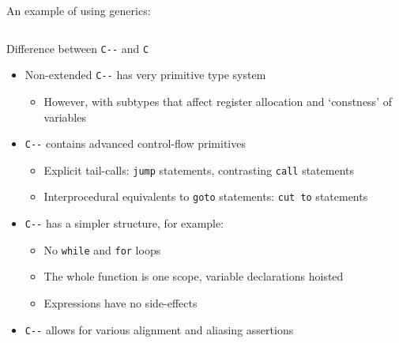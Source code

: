 \documentclass[aspectratio=169]{beamer}
\newcommand{\li}[1]{\lstinline{#1}}
\def\cmm{\texttt{C-\relax-}}
\begin{document}
\begin{frame}
  \centering
  An example of using generics:
  \begin{columns}
    \begin{column}{.5\linewidth}\small
    \end{column}%
    \begin{column}{.5\linewidth}\small
    \end{column}
  \end{columns}
\end{frame}


\begin{frame}{Difference between \cmm{} and \texttt{C}}
  \begin{itemize}
    \item Non-extended \cmm{} has very primitive type system
    \begin{itemize}
      \item However, with subtypes that affect register allocation and `constness' of variables
    \end{itemize} 
    \item \cmm{} contains advanced control-flow primitives
    \begin{itemize}
      \item Explicit tail-calls: \li{jump} statements, contrasting \li{call} statements
      \item Interprocedural equivalents to \li{goto} statements: \li{cut to} statements
    \end{itemize}
    \item \cmm{} has a simpler structure, for example:
    \begin{itemize}
      \item No \li{while} and \li{for} loops
      \item The whole function is one scope, variable declarations hoisted
      \item Expressions have no side-effects
    \end{itemize}
    \item \cmm{} allows for various alignment and aliasing assertions
  \end{itemize}
\end{frame}

%
%
\end{document}
